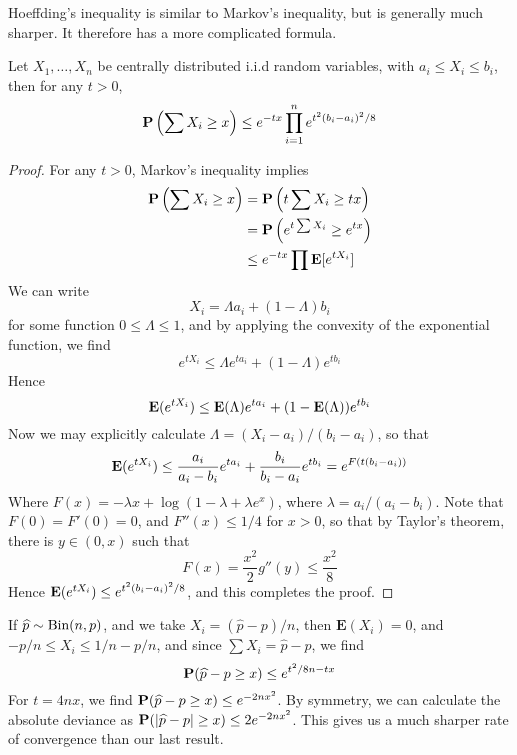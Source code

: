 Hoeffding's inequality is similar to Markov's inequality, but is generally much sharper. It therefore has a more complicated formula.

\begin{theorem}
    Let $X_1, \dots, X_n$ be centrally distributed i.i.d random variables, with $a_i \leq X_i \leq b_i$, then for any $t > 0$,
    \[ \operatorname{\mathbf{P}} \left( \sum X_i \geq x \right) \leq e^{-tx} \prod_{i = 1}^n e^{t^2 (b_i - a_i)^2/8} \]
\end{theorem}
\begin{proof}
    For any $t > 0$, Markov's inequality implies
    \begin{align*}
        \operatorname{\mathbf{P}} \left( \sum X_i \geq x \right) &= \operatorname{\mathbf{P}} \left( t \sum X_i \geq tx \right)\\
        &= \operatorname{\mathbf{P}} \left( e^{t \sum X_i} \geq e^{tx} \right)\\
        &\leq e^{-tx} \prod \mathbf{E}[e^{t X_i}]
    \end{align*}
    We can write
    \[ X_i = \Lambda a_i + (1 - \Lambda) b_i \]
    for some function $0 \leq \Lambda \leq 1$, and by applying the convexity of the exponential function, we find
    \[ e^{tX_i} \leq \Lambda e^{t a_i} + (1 - \Lambda) e^{t b_i} \]
    Hence
    \[ \operatorname{\mathbf{E}}(e^{tX_i}) \leq \operatorname{\mathbf{E}}(\Lambda) e^{t a_i} + (1 - \operatorname{\mathbf{E}}(\Lambda)) e^{t b_i} \]
    Now we may explicitly calculate $\Lambda = (X_i - a_i)/(b_i - a_i)$, so that
    \[ \operatorname{\mathbf{E}}(e^{tX_i}) \leq \frac{a_i}{a_i - b_i} e^{t a_i} + \frac{b_i}{b_i - a_i} e^{t b_i} = e^{F(t(b_i - a_i))} \]
    Where $F(x) = - \lambda x + \log(1 - \lambda + \lambda e^x)$, where $\lambda = a_i/(a_i - b_i)$. Note that $F(0) = F'(0) = 0$, and $F''(x) \leq 1/4$ for $x > 0$, so that by Taylor's theorem, there is $y \in (0,x)$ such that
    \[ F(x) = \frac{x^2}{2} g''(y) \leq \frac{x^2}{8} \]
    Hence $\operatorname{\mathbf{E}}(e^{tX_i}) \leq e^{t^2(b_i - a_i)^2/8}$, and this completes the proof.
\end{proof}

\begin{example}
    If $\widehat{p} \sim \operatorname{\text{Bin}}(n,p)$, and we take $X_i = (\widehat{p} - p)/n$, then $\mathbf{E}(X_i) = 0$, and $-p/n \leq X_i \leq 1/n-p/n$, and since $\sum X_i = \widehat{p} - p$, we find
    \[ \operatorname{\mathbf{P}}(\widehat{p} - p \geq x) \leq e^{t^2/8n - tx} \]
    For $t = 4nx$, we find $\operatorname{\mathbf{P}}(\widehat{p} - p \geq x) \leq e^{-2nx^2}$. By symmetry, we can calculate the absolute deviance as $\operatorname{\mathbf{P}}(|\widehat{p} - p| \geq x) \leq 2e^{-2nx^2}$. This gives us a much sharper rate of convergence than our last result.
\end{example}

